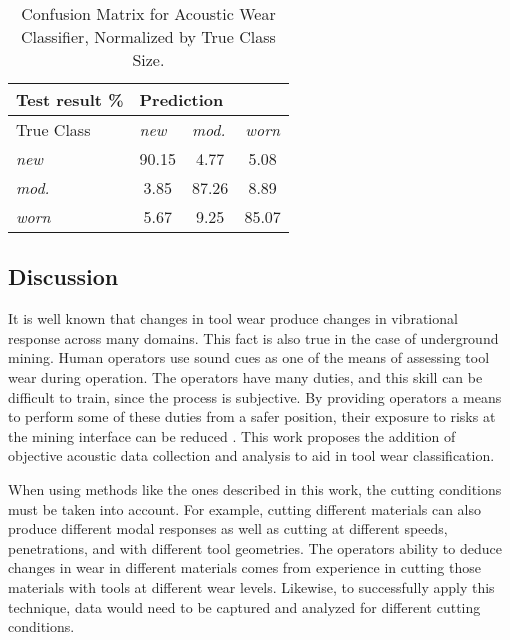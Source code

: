 \begin{table}[h]
\centering
\caption{Confusion Matrix for Acoustic Wear Classifier, Normalized by True Class Size. }
\label{tab:conf}
\begin{tabular}{l|ccc|}
{Test result \%}   & \multicolumn{3}{l|}{Prediction}                 \\ \hline
{True Class} & \multicolumn{1}{l|}{\textit{new}} & \multicolumn{1}{l|}{\textit{mod.}} & {\textit{worn}}  \\ \hline
{\textit{new}}        & 90.15                   & 4.77                     & 5.08 \\
{\textit{mod.}}       & 3.85                    & 87.26                    & 8.89 \\
{\textit{worn}}       & 5.67                    & 9.25                     & 85.07
\end{tabular}
\end{table}



\subsection{Discussion}

It is well known that changes in tool wear produce changes in vibrational response
across many domains. This fact is also true in the case of underground mining. 
Human operators use sound cues as one of the means of assessing tool wear during operation.
The operators have many duties, and this skill can be difficult to train, 
since the process is subjective. By providing operators a means to perform some of these
duties from a safer position, their exposure to risks at the mining interface can be reduced
\cite{Bartels2009}. 
This work proposes the addition of objective acoustic data collection and analysis to aid in tool wear classification. 

When using methods like the ones described in this work, the cutting conditions must be taken into account.
For example, cutting different materials can also produce different modal responses as well as cutting
at different speeds, penetrations, and with different tool geometries. The operators ability to deduce
changes in wear in different materials comes from experience in cutting those materials with tools at 
different wear levels. Likewise, to successfully apply this technique, data would need to be captured
and analyzed for different cutting conditions.

